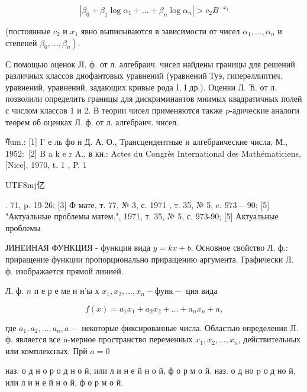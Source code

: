 \documentclass[10pt]{article}
\begin{document}
\[

\left|\beta_{0}+\beta_{1} \log \alpha_{1}+\ldots+\beta_{n} \log \alpha_{n}\right|>c_{2} B^{-x_{1}}

\]



(постоянные $c_{2}$ и $x_{1}$ явно выписываются в зависимости от чисел $\alpha_{1}, \ldots, \alpha_{n}$ и степеней $\left.\beta_{0}, \ldots, \beta_{n}\right)$.



С помощью оценок ЈI. ф. от л. алгебраич. чисел найдены границы для решений различных классов диофантовых уравнений (уравнений Туэ, гиперәллиптич. уравнений, уравнений, задающих кривые рода I, І др.). Оценки Л. Ћ. от л. позволили определить границы для дискриминантов мнимых квадратичных полей с числом классов 1 и 2. В теории чисел применяются также $p$-адические аналоги теорем об оценках Л. ф. от л. алгебраич. чисел.



ग̃um.: [1] I' е ль фо н Д. А. О., Трансцендентные и алгебраические числа, М., $1952:$ [2] B a k e r A., в кн.: Actes du Congrès International des Mathématiciens, [Nice], 1970, t. 1 , P. 1 \begin{CJK}{UTF8}{mj}亿\end{CJK}. 71, p. 19-26; [3] Ф мате, т. 77, № 3, с. 1971 , т. 35, № 5, c. $973-90$; [5] "Актуальные проблемы матем.", 1971, т. 35, № 5, с. 973-90; [5] Актуальные проблемы



ЈИНЕИНАЯ ФУНКЦИЯ - функция вида $y=k x+b$. Основное свойство Л. ф.: приращение функции пропорционально приращению аргумента. Графически Л. ф. изображается прямой линией.



Л. ф. $n$ п е р е ме н н'ы х $x_{1}, x_{2}, \ldots, x_{n}-ф у н к-$ ция вида



\[

f(x)=a_{1} x_{1}+a_{2} x_{2}+\ldots+a_{n} x_{n}+a,

\]



где $a_{1}, a_{2}, \ldots, a_{n}, a-$ некоторые фиксированные числа. Областью определения ЈI. ф. является все n-мерное пространство переменных $x_{1}, x_{2}, \ldots, x_{n}$, действительных или комплексных. Прй $a=0$

наз. о д н о р о д н о й, или л и н е й н о й, ф о р м о й. наз. о д но $\mathrm{p}$ о д но й, или л и н е й н о й, ф о р м о й.
\end{document}
